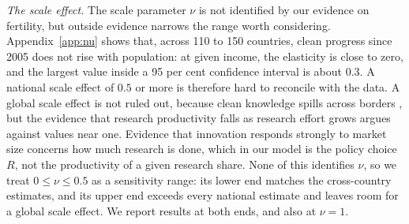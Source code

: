 \documentclass[11pt]{article}
\begin{document}
\emph{The scale effect.} The scale parameter $\nu$ is not identified by our evidence on fertility, but
outside evidence narrows the range worth considering. Appendix~\ref{app:nu} shows that, across 110 to 150 countries, clean progress
since 2005 does not rise with population: at given income, the elasticity is close to zero, and the
largest value inside a 95 per cent confidence interval is about $0.3$. A national scale effect of $0.5$ or more is therefore hard to reconcile with the data.  A global scale effect is not ruled out, because
clean knowledge spills across borders \citep{aghion2016carbon}, but the evidence that research
productivity falls as research effort grows \citep{jones1995,bloom2020} argues against values near one.
Evidence that innovation responds strongly to market size \citep{acemoglulinn2004} concerns how much
research is done, which in our model is the policy choice $R$, not the productivity of a given research
share. None of this identifies $\nu$, so we treat $0\le\nu\le0.5$ as a sensitivity range: its lower end matches
the cross-country estimates, and its upper end exceeds every national estimate and leaves room for a
global scale effect. We report results at both ends, and also at $\nu=1$.
\end{document}
